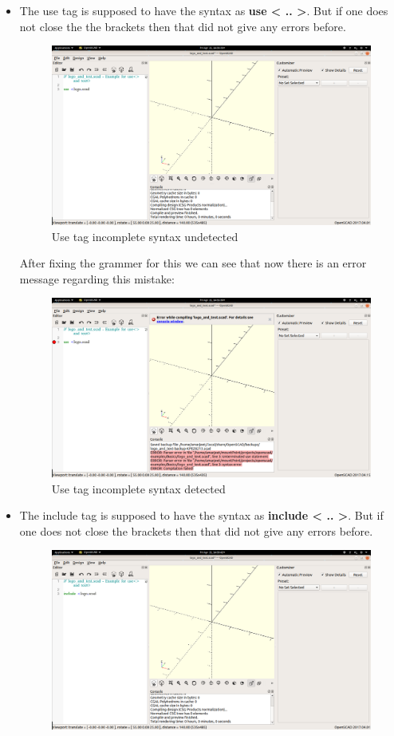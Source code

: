 \begin{itemize}
	\item The use tag is supposed to have the syntax as \textbf{use < .. >}. But if one does not close the the brackets then that did not give any errors before.
	\begin{figure}[H]
		\centering
		\includegraphics[width=\linewidth]{images/output/grammer_use_old.png}
		\caption{Use tag incomplete syntax undetected}
	\end{figure}
	After fixing the grammer for this we can see that now there is an error message regarding this mistake:
	\begin{figure}[H]
		\centering
		\includegraphics[width=\linewidth]{images/output/grammer_use_new.png}
		\caption{Use tag incomplete syntax detected}
	\end{figure}
	\item The include tag is supposed to have the syntax as \textbf{include < .. >}. But if one does not close the brackets then that did not give any errors before.
	\begin{figure}[H]
		\centering
		\includegraphics[width=\linewidth]{images/output/grammer_include_old.png}

\end{figure}
\end{itemize}
